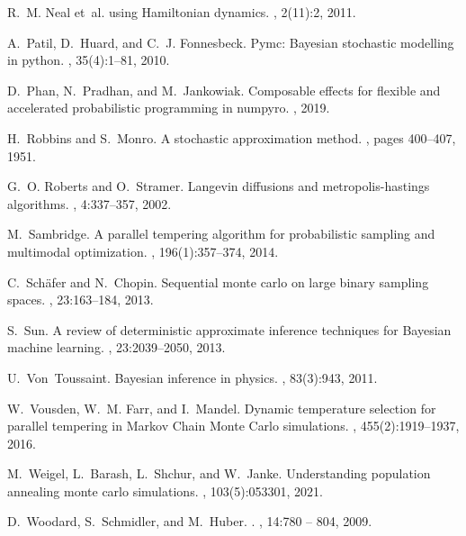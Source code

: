 \documentclass[12pt]{article}
\begin{document}
\begin{thebibliography}{10}
    R.~M. Neal et~al.
     using {H}amiltonian dynamics.
    , 2(11):2, 2011.
    
    A.~Patil, D.~Huard, and C.~J. Fonnesbeck.
    \newblock Pymc: {B}ayesian stochastic modelling in python.
    , 35(4):1--81, 2010.
    
    D.~Phan, N.~Pradhan, and M.~Jankowiak.
    \newblock Composable effects for flexible and accelerated probabilistic
      programming in numpyro.
    , 2019.
    
    H.~Robbins and S.~Monro.
    \newblock A stochastic approximation method.
    , pages 400--407, 1951.
    
    G.~O. Roberts and O.~Stramer.
    \newblock Langevin diffusions and metropolis-hastings algorithms.
    , 4:337--357,
      2002.
    
    M.~Sambridge.
    \newblock A parallel tempering algorithm for probabilistic sampling and
      multimodal optimization.
    , 196(1):357--374, 2014.
    
    C.~Sch{\"a}fer and N.~Chopin.
    \newblock Sequential monte carlo on large binary sampling spaces.
    , 23:163--184, 2013.
    
    S.~Sun.
    \newblock A review of deterministic approximate inference techniques for
      {B}ayesian machine learning.
    , 23:2039--2050, 2013.
    
    U.~Von~Toussaint.
    \newblock Bayesian inference in physics.
    , 83(3):943, 2011.
    
    W.~Vousden, W.~M. Farr, and I.~Mandel.
    \newblock Dynamic temperature selection for parallel tempering in {M}arkov
      {C}hain {M}onte {C}arlo simulations.
    ,
      455(2):1919--1937, 2016.
    
    M.~Weigel, L.~Barash, L.~Shchur, and W.~Janke.
    \newblock Understanding population annealing monte carlo simulations.
    , 103(5):053301, 2021.
    
    D.~Woodard, S.~Schmidler, and M.~Huber.
    .
    , 14:780 -- 804, 2009.
    
    \end{thebibliography}
    
    
\end{document}
